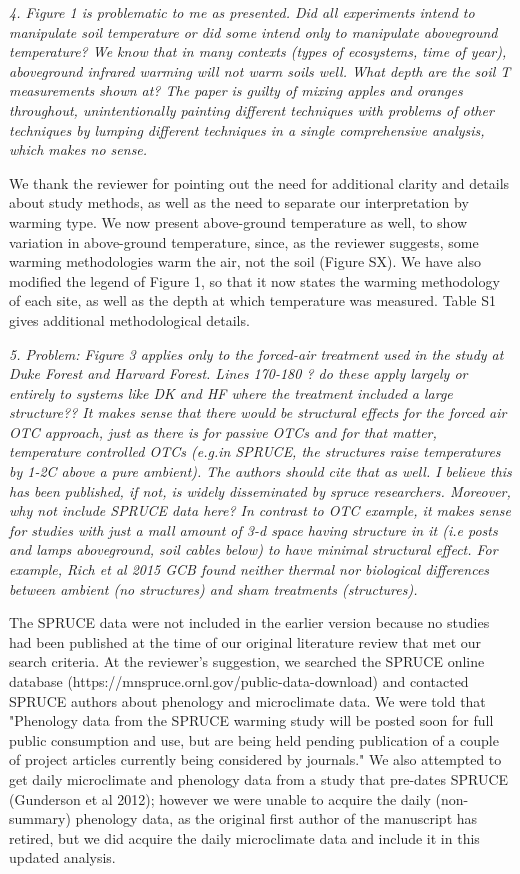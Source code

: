 \documentclass[11pt,a4paper]{letter}
\begin{document}
\par \emph{4. Figure 1 is problematic to me as presented. Did all experiments intend to manipulate soil temperature or did some intend only to manipulate aboveground temperature? We know that in many contexts (types of ecosystems, time of year), aboveground infrared warming will not warm soils well. What depth are the soil T measurements shown at? The paper is guilty of mixing apples and oranges throughout, unintentionally painting different techniques with problems of other techniques by lumping different techniques in a single comprehensive analysis, which makes no sense.}
\par We thank the reviewer for pointing out the need for additional clarity and details about study methods, as well as the need to separate our interpretation by warming type. We now present above-ground temperature as well, to show variation in above-ground temperature, since, as the reviewer suggests, some warming methodologies warm the air, not the soil (Figure SX). We have also modified the legend of Figure 1, so that it now states the warming methodology of each site, as well as the depth at which temperature was measured. Table S1 gives additional methodological details.


\emph{5. Problem: Figure 3 applies only to the forced-air treatment used in the study at Duke Forest and Harvard Forest. Lines 170-180 ? do these apply largely or entirely to systems like DK and HF where the treatment included a large structure?? It makes sense that there would be structural effects for the forced air OTC approach, just as there is for passive OTCs and for that matter, temperature controlled OTCs (e.g.in SPRUCE, the structures raise temperatures by 1-2C above a pure ambient). The authors should cite that as well. I believe this has been published, if not, is widely disseminated by spruce researchers. Moreover, why not include SPRUCE data here? In contrast to OTC example, it makes sense for studies with just a  mall amount of 3-d space having structure in it (i.e posts and lamps aboveground, soil cables below) to have minimal structural effect. For example, Rich et al 2015 GCB found neither thermal nor biological differences between ambient (no structures) and sham treatments (structures).}
\par The SPRUCE data were not included in the earlier version because no studies had been published at the time of our original literature review that met our search criteria.  At the reviewer's suggestion, we searched the SPRUCE online database (https://mnspruce.ornl.gov/public-data-download) and contacted SPRUCE authors about phenology and microclimate data. We were told that "Phenology data from the SPRUCE warming study will be posted soon for full public consumption and use, but are being held pending publication of a couple of project articles currently being considered by journals." We also attempted to get daily microclimate and phenology data from a study that pre-dates SPRUCE (Gunderson et al 2012); however we were unable to acquire the daily (non-summary) phenology data, as the original first author of the manuscript has retired, but we did acquire the daily microclimate data and include it in this updated analysis.  
\end{document}
